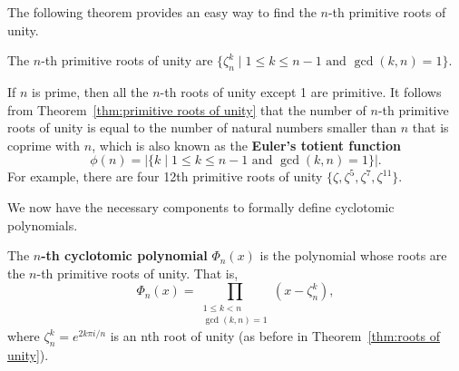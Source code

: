 \documentclass[../main.tex]{subfiles}
\begin{document}
The following theorem provides an easy way to find the $n$-th primitive roots of unity. %

\begin{theorem}
The $n$-th primitive roots of unity are $\{\zeta_n^k \mid 1 \le k \le n-1 \text{ and } \gcd(k, n) = 1 \}$. 
\label{thm:primitive roots of unity}
\end{theorem}
If $n$ is prime, then all the $n$-th roots of unity except 1 are primitive. It follows from Theorem~\ref{thm:primitive roots of unity} that the number of $n$-th primitive roots of unity is equal to the number of natural numbers smaller than $n$ that is coprime with $n$, which is also known as the \textbf{Euler's totient function} 
\[ \phi(n)=|\{k \mid 1 \le k \le n-1 \text{ and } \gcd(k,n)=1\}|. \] %
For example, there are four 12th primitive roots of unity $\{\zeta, \zeta^5, \zeta^7, \zeta^{11}\}$.

We now have the necessary components to formally define cyclotomic polynomials.

\begin{definition}
The \textbf{$n$-th cyclotomic polynomial} $\Phi_n(x)$ \reversemarginpar
{}
is the polynomial whose roots are the $n$-th primitive roots of unity. That is,
\begin{equation*}
    \Phi_n(x) = \prod_{\substack{1 \le k < n \\ \gcd(k,n)=1}} (x-\zeta_n^k),
\end{equation*}
where $\zeta_n^k=e^{2k\pi i/n}$ is an nth root of unity (as before in Theorem~\ref{thm:roots of unity}). 
\end{definition}
\end{document}
